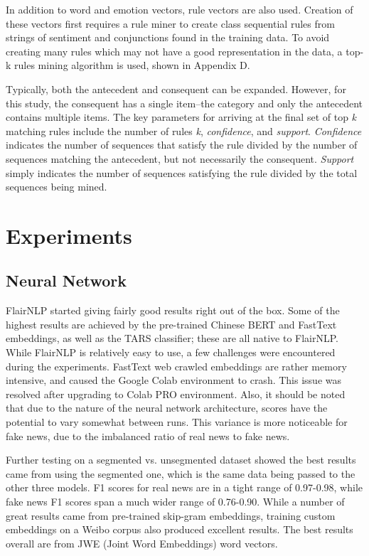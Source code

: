 \documentclass [11pt, proquest] {uwthesis}[2020/02/24]
\begin{document}
In addition to word and emotion vectors, rule vectors are also used. Creation of these vectors first requires a rule miner to create class sequential rules from strings of sentiment and conjunctions found in the training data. To avoid creating many rules which may not have a good representation in the data, a top-k rules mining algorithm is used, shown in Appendix D.

Typically, both the antecedent and consequent can be expanded. However, for this study, the consequent has a single item--the category and only the antecedent contains multiple items. The key parameters for arriving at the final set of top \textit{k} matching rules include the number of rules \textit{k}, \textit{confidence}, and \textit{support}. \textit{Confidence} indicates the number of sequences that satisfy the rule divided by the number of sequences matching the antecedent, but not necessarily the consequent. \textit{Support} simply indicates the number of sequences satisfying the rule divided by the total sequences being mined.

\chapter{Experiments}

\section{Neural Network}
FlairNLP started giving fairly good results right out of the box. Some of the highest results are achieved by the pre-trained Chinese BERT and FastText embeddings, as well as the TARS classifier; these are all native to FlairNLP. While FlairNLP is relatively easy to use, a few challenges were encountered during the experiments. FastText web crawled embeddings are rather memory intensive, and caused the Google Colab environment to crash. This issue was resolved after upgrading to Colab PRO environment. Also, it should be noted that due to the nature of the neural network architecture, scores have the potential to vary somewhat between runs. This variance is more noticeable for fake news, due to the imbalanced ratio of real news to fake news.

Further testing on a segmented vs. unsegmented dataset showed the best results came from using the segmented one, which is the same data being passed to the other three models. F1 scores for real news are in a tight range of 0.97-0.98, while fake news F1 scores span a much wider range of 0.76-0.90. While a number of great results came from pre-trained skip-gram embeddings, training custom embeddings on a Weibo corpus also produced excellent results. The best results overall are from JWE (Joint Word Embeddings) word vectors. 
\end{document}

